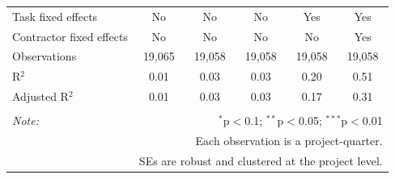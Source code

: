 \documentclass[
]{article}
\begin{document}
\begin{table}[H]
\begin{tabular}{@{\extracolsep{-2pt}}lccccc}
Task fixed effects & No & No & No & Yes & Yes \\ 
Contractor fixed effects & No & No & No & No & Yes \\ 
Observations & 19,065 & 19,058 & 19,058 & 19,058 & 19,058 \\ 
R$^{2}$ & 0.01 & 0.03 & 0.03 & 0.20 & 0.51 \\ 
Adjusted R$^{2}$ & 0.01 & 0.03 & 0.03 & 0.17 & 0.31 \\ 
\hline 
\hline \\[-1.8ex] 
\textit{Note:}  & \multicolumn{5}{r}{$^{*}$p$<$0.1; $^{**}$p$<$0.05; $^{***}$p$<$0.01} \\ 
 & \multicolumn{5}{r}{Each observation is a project-quarter.} \\ 
 & \multicolumn{5}{r}{SEs are robust and clustered at the project level.} \\ 
\end{tabular} 
\end{table}
\end{document}
